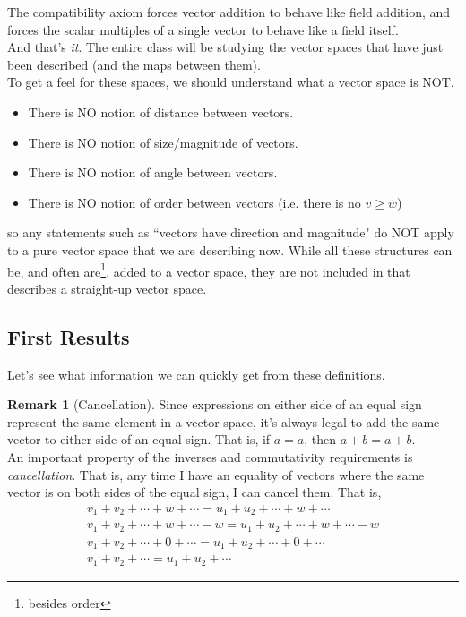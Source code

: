 \documentclass[11pt, reqno]{amsart}
\theoremstyle{definition} %
\newtheorem{remark}[theorem]{Remark}
\begin{document}
The compatibility axiom forces vector addition to behave like field addition, and forces the scalar multiples of a single vector to behave like a field itself. \\
\indent And that's \emph{it}. The entire class will be studying the vector spaces that have just been described (and the maps between them).\\
\indent To get a feel for these spaces, we should understand what a vector space is NOT.
\begin{itemize}[itemsep=0.5em, topsep=0.5em]
    \item There is NO notion of distance between vectors.
    \item There is NO notion of size/magnitude of vectors.
    \item There is NO notion of angle between vectors.
    \item There is NO notion of order between vectors (i.e. there is no $v\geq w$)
\end{itemize}
so any statements such as ``vectors have direction and magnitude" do NOT apply to a pure vector space that we are describing now. While all these structures can be, and often are\footnote{besides order}, added to a vector space, they are not included in that describes a straight-up vector space.

\subsection{First Results}

Let's see what information we can quickly get from these definitions.
\begin{remark}[Cancellation]\label{cancel}
Since expressions on either side of an equal sign represent the same element in a vector space, it's always legal to add the same vector to either side of an equal sign. That is, if $a=a$, then $a+b=a+b$.\\
\indent An important property of the inverses and commutativity requirements is \emph{cancellation}. That is, any time I have an equality of vectors where the same vector is on both sides of the equal sign, I can cancel them. That is,
\begin{equation}
    \begin{gathered}
        v_1+v_2+\cdots + w+\cdots = u_1+u_2+\cdots + w + \cdots\\
        v_1+v_2+\cdots + w+\cdots - w= u_1+u_2+\cdots + w + \cdots - w\\
        v_1+v_2+\cdots + 0+\cdots = u_1+u_2+\cdots + 0 + \cdots\\
        v_1+v_2+\cdots=u_1+u_2+\cdots
    \end{gathered}
\end{equation}
\end{remark}
\end{document}
